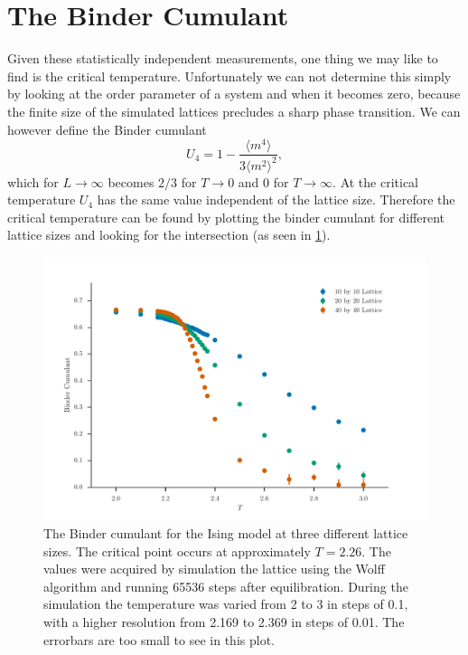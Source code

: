 \documentclass[11pt, a4paper]{report} %
\begin{document}
\section{The Binder Cumulant}
Given these statistically independent measurements, one thing we may like to find is the critical temperature.
Unfortunately we can not determine this simply by looking at the order parameter of a system and when it becomes zero, because the finite size of the simulated lattices precludes a sharp phase transition.
We can however define the Binder cumulant\cite{binder:1981b}
\begin{equation}
	U_4 = 1 - \frac{\langle m^4 \rangle}{3 \langle m^2 \rangle^2},
\end{equation}
which for \(L \to \infty\) becomes \(2/3\) for \(T \to 0\) and 0 for \(T \to \infty\).\cite{landau:2015}
At the critical temperature \(U_4\) has the same value independent of the lattice size.
Therefore the critical temperature can be found by plotting the binder cumulant for different lattice sizes and looking for the intersection (as seen in \cref{fig:ising_binder_cumulant}).
\begin{figure}[h]
	\includegraphics[width=\textwidth]{wolff_binder_cumulant.pdf}
	\caption{The Binder cumulant for the Ising model at three different lattice sizes. The critical point occurs at approximately \(T = 2.26\). The values were acquired by simulation the lattice using the Wolff algorithm and running 65536 steps after equilibration. During the simulation the temperature was varied from 2 to 3 in steps of 0.1, with a higher resolution from 2.169 to 2.369 in steps of 0.01. The errorbars are too small to see in this plot.}
	\label{fig:ising_binder_cumulant}
\end{figure}
\end{document}
